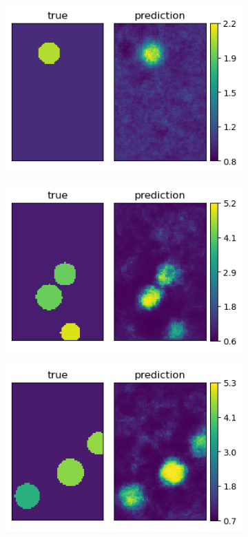 \documentclass[10pt]{article}
\newcommand{\nhghalfwidth}{0.48\linewidth}
\newcommand{\nhgtotalheight}{4cm}
\begin{document}
\begin{figure}[!h]
  \centering
  \begin{subfigure}[c]{\nhghalfwidth}
    \centering
    \includegraphics[totalheight=\nhgtotalheight]{Figures/Results1/ex1/mu.png}
  \end{subfigure}
  \begin{subfigure}[c]{\nhghalfwidth}
    \centering
    \includegraphics[totalheight=\nhgtotalheight]{Figures/Results1/ex2/mu.png}
  \end{subfigure}
  \begin{subfigure}[c]{\nhghalfwidth}
    \centering
    \includegraphics[totalheight=\nhgtotalheight]{Figures/Results1/ex3/mu.png}

\end{subfigure}
\end{figure}
\end{document}
